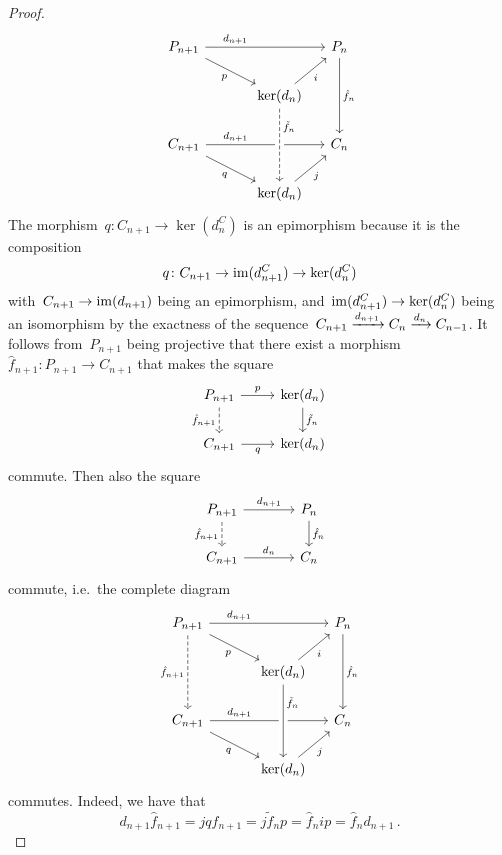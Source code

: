 \begin{proof}
  \[
    \begin{tikzcd}[column sep = small]
        P_{n+1}
        \arrow{rrr}[above, near start]{d_{n+1}}
        \arrow{drr}[below left]{p}
      & {}
      & {}
      & P_n
        \arrow{dd}[right]{\hat{f}_n}
      \\
        {}
      & {}
      & \ker(d_n)
        \arrow{ur}[below right]{i}
      & {}
      \\
        C_{n+1}
        \arrow{rrr}[above, near start]{d_{n+1}}
        \arrow{drr}[below left]{q}
      & {}
      & {}
      & C_n
      \\
        {}
      & {}
      & \ker(d_n)
        \arrow[dashed, from=uu, crossing over, "\tilde{f}_n", right, near start]
        \arrow{ur}[below right]{j}
      & {}
    \end{tikzcd}
  \]
  The morphism~$q \colon C_{n+1} \to \ker(d^C_n)$ is an epimorphism because it is the composition
  \[
    q
    \colon
    C_{n+1}
    \to
    \operatorname{im}(d^C_{n+1})
    \to
    \ker(d^C_n)
  \]
  with~$C_{n+1} \to \operatorname{im}(d_{n+1})$ being an epimorphism, and~$\operatorname{im}(d^C_{n+1}) \to \ker(d^C_n)$ being an isomorphism by the exactness of the sequence~$C_{n+1} \xrightarrow{d_{n+1}} C_n \xrightarrow{d_n} C_{n-1}$.
  It follows from~$P_{n+1}$ being projective that there exist a morphism~$\hat{f}_{n+1} \colon P_{n+1} \to C_{n+1}$ that makes the square
  \[
    \begin{tikzcd}
        P_{n+1}
        \arrow{r}[above]{p}
        \arrow[dashed]{d}[left]{\hat{f}_{n+1}}
      & \ker(d_n)
        \arrow{d}[right]{\tilde{f}_n}
      \\
        C_{n+1}
        \arrow{r}[below]{q}
      & \ker(d_n)
    \end{tikzcd}
  \]
  commute.
  Then also the square
  \[
    \begin{tikzcd}[column sep = large]
        P_{n+1}
        \arrow{r}[above]{d_{n+1}}
        \arrow[dashed]{d}[left]{\hat{f}_{n+1}}
      & P_n
        \arrow{d}[right]{\hat{f}_n}
      \\
        C_{n+1}
        \arrow{r}[above]{d_n}
      & C_n
    \end{tikzcd}
  \]
  commute, i.e.\ the complete diagram
  \[
    \begin{tikzcd}[column sep = small]
        P_{n+1}
        \arrow{rrr}[above, near start]{d_{n+1}}
        \arrow{drr}[below left]{p}
        \arrow[dashed]{dd}[left]{\hat{f}_{n+1}}
      & {}
      & {}
      & P_n
        \arrow{dd}[right]{\hat{f}_n}
      \\
        {}
      & {}
      & \ker(d_n)
        \arrow{ur}[below right]{i}
      & {}
      \\
        C_{n+1}
        \arrow{rrr}[above, near start]{d_{n+1}}
        \arrow{drr}[below left]{q}
      & {}
      & {}
      & C_n
      \\
        {}
      & {}
      & \ker(d_n)
        \arrow[from=uu, crossing over, "\tilde{f}_n", right, near start]
        \arrow{ur}[below right]{j}
      & {}
    \end{tikzcd}
  \]
  commutes.
  Indeed, we have that
  \[
      d_{n+1} \hat{f}_{n+1}
    = j q \hat{f}_{n+1}
    = j \tilde{f}_n p
    = \hat{f}_n i p
    = \hat{f}_n d_{n+1} \,.
  \]
  

\end{proof}
